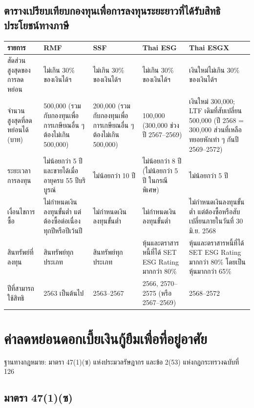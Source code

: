 \documentclass[12pt,a4paper]{article}
\begin{document}
\subsection*{ตารางเปรียบเทียบกองทุนเพื่อการลงทุนระยะยาวที่ได้รับสิทธิประโยชน์ทางภาษี}

\begin{longtable}{|p{2.3cm}|p{2.7cm}|p{2.7cm}|p{2.7cm}|p{3.3cm}|}
\hline
\textbf{รายการ} & \textbf{RMF} & \textbf{SSF} & \textbf{Thai ESG} & \textbf{Thai ESGX} \\
\hline
\endhead
สัดส่วนสูงสุดของการลดหย่อน & ไม่เกิน 30\% ของเงินได้ฯ & ไม่เกิน 30\% ของเงินได้ฯ & ไม่เกิน 30\% ของเงินได้ฯ & เงินใหม่ไม่เกิน 30\% ของเงินได้ฯ \\
\hline
จำนวนสูงสุดที่ลดหย่อนได้ (บาท) & 500,000 (รวมกับกองทุนเพื่อการเกษียณอื่น ๆ ต้องไม่เกิน 500,000) & 200,000 (รวมกับกองทุนเพื่อการเกษียณอื่น ๆ ต้องไม่เกิน 500,000) & 100,000 (300,000 ช่วงปี 2567--2569) & เงินใหม่ 300,000; LTF เดิมที่สับเปลี่ยน 500,000 (ปี 2568 = 300,000 ส่วนที่เหลือทยอยหักเท่า ๆ กันปี 2569--2572) \\
\hline
ระยะเวลาการลงทุน & ไม่น้อยกว่า 5 ปี และขายได้เมื่ออายุครบ 55 ปีบริบูรณ์ & ไม่น้อยกว่า 10 ปี & ไม่น้อยกว่า 8 ปี (ไม่น้อยกว่า 5 ปี ในกรณีพิเศษ) & ไม่น้อยกว่า 5 ปี \\
\hline
เงื่อนไขการซื้อ & ไม่กำหนดเงินลงทุนขั้นต่ำ แต่ต้องซื้อต่อเนื่องทุกปีหรือปีเว้นปี & ไม่กำหนดเงินลงทุนขั้นต่ำ & ไม่กำหนดเงินลงทุนขั้นต่ำ & ไม่กำหนดเงินลงทุนขั้นต่ำ แต่ต้องซื้อหรือสับเปลี่ยนภายในวันที่ 30 มิ.ย. 2568 \\
\hline
สินทรัพย์ที่ลงทุน & สินทรัพย์ทุกประเภท & สินทรัพย์ทุกประเภท & หุ้นและตราสารหนี้ที่ได้ SET ESG Rating มากกว่า 80\% & หุ้นและตราสารหนี้ที่ได้ SET ESG Rating มากกว่า 80\% โดยเป็นหุ้นมากกว่า 65\% \\
\hline
ปีที่สามารถใช้สิทธิ & 2563 เป็นต้นไป & 2563--2567 & 2566, 2570--2575 (หรือ 2567--2569) & 2568--2572 \\
\hline
\end{longtable}

\newpage
\section{ค่าลดหย่อนดอกเบี้ยเงินกู้ยืมเพื่อที่อยู่อาศัย}

ฐานทางกฎหมาย: มาตรา 47(1)(ซ) แห่งประมวลรัษฎากร และข้อ 2(53) แห่งกฎกระทรวงฉบับที่ 126

\subsection*{มาตรา 47(1)(ซ)}
\end{document}
